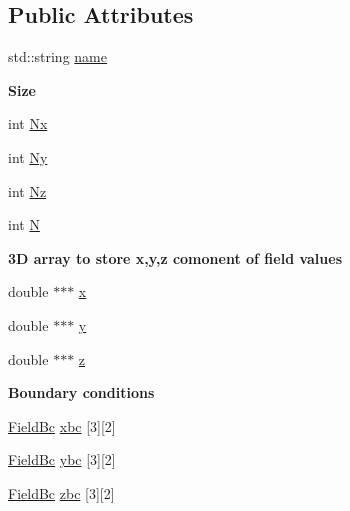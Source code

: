 \subsection*{Public Attributes}
\begin{DoxyCompactItemize}
\item 
std\+::string \hyperlink{classmy_octree_1_1_vec_field_a9722e7518ff5a06db7684bcdfada5b0e}{name}
\end{DoxyCompactItemize}
\begin{Indent}{\bf Size}\par
\begin{DoxyCompactItemize}
\item 
int \hyperlink{classmy_octree_1_1_vec_field_ae0d5070112c377b5e6ff475c04395e9c}{Nx}
\item 
int \hyperlink{classmy_octree_1_1_vec_field_a95aa5dbef9a5fc1bf48f40aa26e0d7fd}{Ny}
\item 
int \hyperlink{classmy_octree_1_1_vec_field_ac2ba7ec87e8f1bb39844cd45ab054f95}{Nz}
\item 
int \hyperlink{classmy_octree_1_1_vec_field_a27f8de2890d5a43e722b2284b784948e}{N}
\end{DoxyCompactItemize}
\end{Indent}
\begin{Indent}{\bf 3\+D array to store x,y,z comonent of field values}\par
\begin{DoxyCompactItemize}
\item 
double $\ast$$\ast$$\ast$ \hyperlink{classmy_octree_1_1_vec_field_aa2f76e1e3ee56d0a54d42cf959354bc9}{x}
\item 
double $\ast$$\ast$$\ast$ \hyperlink{classmy_octree_1_1_vec_field_ace7d75993bdfee30c7ced97ada5de324}{y}
\item 
double $\ast$$\ast$$\ast$ \hyperlink{classmy_octree_1_1_vec_field_aee1c8c4d393246a34793a5cde59071b8}{z}
\end{DoxyCompactItemize}
\end{Indent}
\begin{Indent}{\bf Boundary conditions}\par
\begin{DoxyCompactItemize}
\item 
\hyperlink{namespacemy_octree_a1b5634e126358fc57232cfc9e6d96ad9}{Field\+Bc} \hyperlink{classmy_octree_1_1_vec_field_a89bb31aefadf48f4c2530ec11f3d95ab}{xbc} \mbox{[}3\mbox{]}\mbox{[}2\mbox{]}
\item 
\hyperlink{namespacemy_octree_a1b5634e126358fc57232cfc9e6d96ad9}{Field\+Bc} \hyperlink{classmy_octree_1_1_vec_field_a423ac64f945635fc8e1a328f8d93a297}{ybc} \mbox{[}3\mbox{]}\mbox{[}2\mbox{]}
\item 
\hyperlink{namespacemy_octree_a1b5634e126358fc57232cfc9e6d96ad9}{Field\+Bc} \hyperlink{classmy_octree_1_1_vec_field_a8393be7c311149c9d4e449521c4f34a0}{zbc} \mbox{[}3\mbox{]}\mbox{[}2\mbox{]}
\end{DoxyCompactItemize}
\end{Indent}


